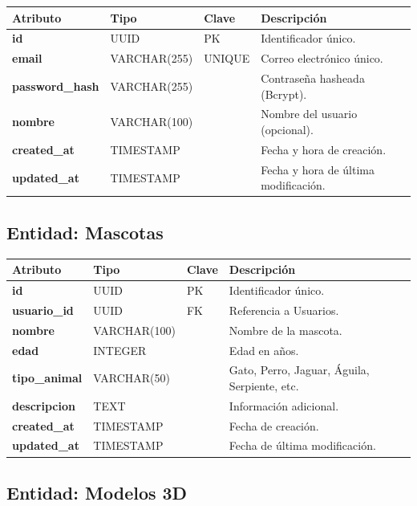 \documentclass[12pt,a4paper]{article}
\begin{document}
\begin{table}[htbp]
\centering
\renewcommand{\arraystretch}{1.1}
\begin{tabularx}{\textwidth}{>{\bfseries}p{2.5cm} p{1.5cm} p{1.5cm} X}
\toprule
Atributo & Tipo & Clave & Descripci\'on \\
\midrule
id & UUID & PK & Identificador \'unico. \\
email & VARCHAR(255) & UNIQUE & Correo electr\'onico \'unico. \\
password\_hash & VARCHAR(255) & & Contrase\~na hasheada (Bcrypt). \\
nombre & VARCHAR(100) & & Nombre del usuario (opcional). \\
created\_at & TIMESTAMP & & Fecha y hora de creaci\'on. \\
updated\_at & TIMESTAMP & & Fecha y hora de \'ultima modificaci\'on. \\
\bottomrule
\end{tabularx}
\end{table}

\subsection{Entidad: Mascotas}

\begin{table}[htbp]
\centering
\renewcommand{\arraystretch}{1.1}
\begin{tabularx}{\textwidth}{>{\bfseries}p{2.5cm} p{1.5cm} p{1.5cm} X}
\toprule
Atributo & Tipo & Clave & Descripci\'on \\
\midrule
id & UUID & PK & Identificador \'unico. \\
usuario\_id & UUID & FK & Referencia a Usuarios. \\
nombre & VARCHAR(100) & & Nombre de la mascota. \\
edad & INTEGER & & Edad en a\~nos. \\
tipo\_animal & VARCHAR(50) & & Gato, Perro, Jaguar, \'Aguila, Serpiente, etc. \\
descripcion & TEXT & & Informaci\'on adicional. \\
created\_at & TIMESTAMP & & Fecha de creaci\'on. \\
updated\_at & TIMESTAMP & & Fecha de \'ultima modificaci\'on. \\
\bottomrule
\end{tabularx}
\end{table}

\subsection{Entidad: Modelos 3D}
\end{document}
